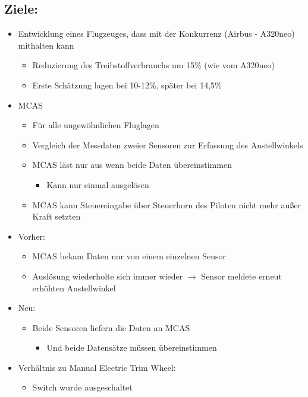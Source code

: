 \documentclass[11pt,a4paper]{article}
\begin{document}
\subsection*{Ziele:}
\begin{itemize}
\item Entwicklung eines Flugzeuges, dass mit der Konkurrenz (Airbus - A320neo) mithalten kann\cite{B-Wikipedia}
\begin{itemize}
	\item Reduzierung des Treibstoffverbrauchs um 15\% (wie vom A320neo)
	\item Erste Schätzung lagen bei 10-12\%, später bei 14,5\%
\end{itemize}
\item MCAS
\begin{itemize}
\item Für alle ungewöhnlichen Fluglagen
\item Vergleich der Messdaten zweier Sensoren zur Erfassung des 			Anstellwinkels
\item MCAS läst nur aus wenn beide Daten übereinstimmen
\begin{itemize}
\item Kann nur einmal ausgelösen
\end{itemize}
\item MCAS kann Steuereingabe über Steuerhorn des Piloten nicht mehr außer Kraft setzten
\end{itemize}
\item Vorher:
\begin{itemize}
\item MCAS bekam Daten nur von einem einzelnen Sensor
\item Auslösung wiederholte sich immer wieder $\longrightarrow$ Sensor meldete erneut erhöhten Anstellwinkel
\end{itemize}
\item Neu:
\begin{itemize}
\item Beide Sensoren liefern die Daten an MCAS
\begin{itemize}
\item Und beide Datensätze müssen übereinstimmen
\end{itemize}
\end{itemize}
\item Verhältnis zu Manual Electric Trim Wheel:
\begin{itemize}
\item Switch wurde ausgeschaltet
\begin{itemize}

\end{itemize}
\end{itemize}
\end{itemize}
\end{document}
